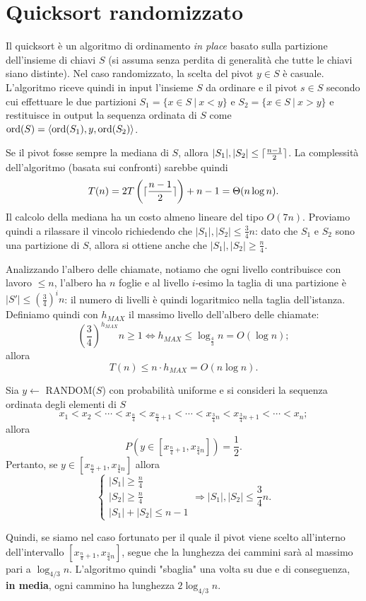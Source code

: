 \section{Quicksort randomizzato}
Il quicksort è un algoritmo di ordinamento \textit{in place} basato sulla partizione dell'insieme di chiavi $S$ (si assuma senza perdita di generalità che tutte le chiavi siano distinte). Nel caso randomizzato, la scelta del pivot $y\in S$ è casuale. L'algoritmo riceve quindi in input l'insieme $S$ da ordinare e il pivot $s\in S$ secondo cui effettuare le due partizioni $S_1=\{x\in S\ |\ x<y\}$ e $S_2=\{x\in S\ |\ x>y\}$ e restituisce in output la sequenza ordinata di $S$ come $\operatorname*{ord}(S)=\langle \operatorname*{ord}(S_1),y,\operatorname*{ord}(S_2) \rangle$.

Se il pivot fosse sempre la mediana di $S$, allora $|S_1|,|S_2| \leq \lceil\frac{n-1}{2}\rceil$. La complessità dell'algoritmo (basata sui confronti) sarebbe quindi
\[
T(n)=2T\left(\lceil\frac{n-1}{2}\rceil\right) +n-1=\Theta(n\log n).
\]
Il calcolo della mediana ha un costo almeno lineare del tipo $O(7n)$. Proviamo quindi a rilassare il vincolo richiedendo che $|S_1|,|S_2| \leq \frac{3}{4}n$: dato che $S_1$ e $S_2$ sono una partizione di $S$, allora si ottiene anche che $|S_1|,|S_2| \geq \frac{n}{4}$.

Analizzando l'albero delle chiamate, notiamo che ogni livello contribuisce con lavoro $\leq n$, l'albero ha $n$ foglie e al livello $i$-esimo la taglia di una partizione è $|S'|\leq (\frac{3}{4})^i n$: il numero di livelli è quindi logaritmico nella taglia dell'istanza. Definiamo quindi con $h_{MAX}$ il massimo livello dell'albero delle chiamate:
\[
\left(\frac{3}{4}\right)^{h_{MAX}}n \geq 1 \Leftrightarrow h_{MAX} \leq \log_{\frac{4}{3}}n=O(\log n);
\]
allora
\[
T(n) \leq n\cdot h_{MAX} = O(n\log n).
\]

Sia $y \leftarrow$ RANDOM($S$) con probabilità uniforme e si consideri la sequenza ordinata degli elementi di $S$
\[
x_1 < x_2 < \cdots < x_{\frac{n}{4}} < x_{\frac{n}{4}+1} < \cdots < x_{\frac{3}{4}n} < x_{\frac{3}{4}n+1} < \cdots < x_n;
\]
allora
\[
P(y\in [x_{\frac{n}{4}+1},x_{\frac{3}{4}n}]) = \frac{1}{2}.
\]
Pertanto, se $y\in [x_{\frac{n}{4}+1},x_{\frac{3}{4}n}]$ allora
\[
\begin{cases}
|S_1|\geq \frac{n}{4} \\
|S_2|\geq \frac{n}{4} \\
|S_1|+|S_2| \leq n-1
\end{cases}
\Rightarrow |S_1|,|S_2|\leq \frac{3}{4}n.
\]

Quindi, se siamo nel caso fortunato per il quale il pivot viene scelto all'interno dell'intervallo $[x_{\frac{n}{4}+1},x_{\frac{3}{4}n}]$, segue che la lunghezza dei cammini sarà al massimo pari a $\log_{4/3}n$. L'algoritmo quindi "sbaglia" una volta su due e di conseguenza, \textbf{in media}, ogni cammino ha lunghezza $2\log_{4/3}n$.

